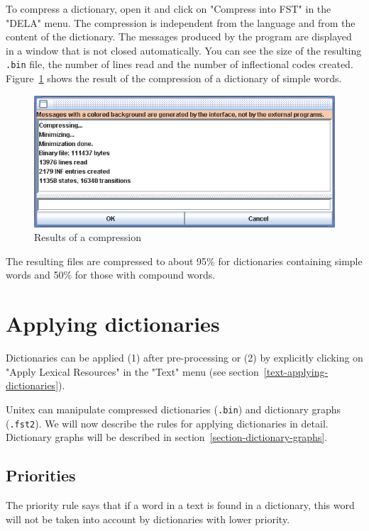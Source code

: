 \noindent To compress a dictionary, open it and click on "Compress into FST" in
the "DELA" menu. The compression is independent from the language and from the content of
the dictionary. The messages produced by the program are displayed in a window
that is not closed automatically. You can see the size of the resulting
\verb+.bin+ file, the number of lines read and the number of inflectional codes
created. Figure~\ref{fig-compression-result} shows the result of
the compression of a dictionary of simple words. \bigskip
\begin{figure}[!h]
\begin{center}
\includegraphics[width=14cm]{resources/img/fig3-9.png}
\caption{Results of a compression\label{fig-compression-result}}
\end{center}
\end{figure}

\bigskip
\noindent The resulting files are compressed to about 95\% for dictionaries containing
simple words and 50\% for those with compound words.

\section{Applying dictionaries}
\label{section-applying-dictionaries}
Dictionaries can be applied (1) after pre-processing or (2) by explicitly 
clicking on "Apply Lexical Resources" in the  "Text" menu (see
section~\ref{text-applying-dictionaries}).

\bigskip
\noindent Unitex can manipulate compressed dictionaries (\verb+.bin+) and
dictionary graphs (\verb+.fst2+). We will now describe  the rules for applying dictionaries
in detail. Dictionary graphs will be described in
section~\ref{section-dictionary-graphs}.

\subsection{Priorities}
\label{section-dictionary-priorities}
The priority rule says that  if a word in a text is found in a dictionary, this
word will not be taken into account by dictionaries with lower priority.


